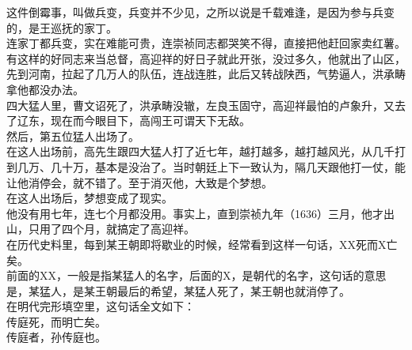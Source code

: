 \begin{multicols}{\theparacolNo}
这件倒霉事，叫做兵变，兵变并不少见，之所以说是千载难逢，是因为参与兵变的，是王巡抚的家丁。\\

连家丁都兵变，实在难能可贵，连崇祯同志都哭笑不得，直接把他赶回家卖红薯。\\

有这样的好同志来当总督，高迎祥的好日子就此开张，没过多久，他就出了山区，先到河南，拉起了几万人的队伍，连战连胜，此后又转战陕西，气势逼人，洪承畴拿他都没办法。\\

四大猛人里，曹文诏死了，洪承畴没辙，左良玉固守，高迎祥最怕的卢象升，又去了辽东，现在而今眼目下，高闯王可谓天下无敌。\\

然后，第五位猛人出场了。\\

在这人出场前，高先生跟四大猛人打了近七年，越打越多，越打越风光，从几千打到几万、几十万，基本是没治了。当时朝廷上下一致认为，隔几天跟他打一仗，能让他消停会，就不错了。至于消灭他，大致是个梦想。\\

在这人出场后，梦想变成了现实。\\

他没有用七年，连七个月都没用。事实上，直到崇祯九年（1636）三月，他才出山，只用了四个月，就搞定了高迎祥。\\

在历代史料里，每到某王朝即将歇业的时候，经常看到这样一句话，XX死而X亡矣。\\

前面的XX，一般是指某猛人的名字，后面的X，是朝代的名字，这句话的意思是，某猛人，是某王朝最后的希望，某猛人死了，某王朝也就消停了。\\

在明代完形填空里，这句话全文如下：\\

传庭死，而明亡矣。\\

传庭者，孙传庭也。\\
\ifnum{}
	\end{multicols}
\fi
\newpage
